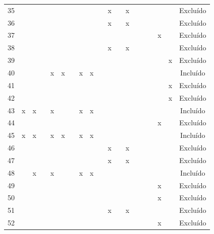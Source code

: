 \documentclass[
	12pt,				%
	oneside,			%
	a4paper,			%
	english,			%
	brazil				%
	]{abntex2ppgsi}
\begin{document}
\begin{apendicesenv}
\begin{table}[H]
\begin{tabular}{c | c c c c c c c c | c c c c c c c c c | c}
35 &   &   &   &   &   &   &   &   &   & x &   & x &   &   &   &   &   & Excluído \\
36 &   &   &   &   &   &   &   &   &   & x &   & x &   &   &   &   &   & Excluído \\
37 &   &   &   &   &   &   &   &   &   &   &   &   &   &   &   & x &   & Excluído \\
38 &   &   &   &   &   &   &   &   &   & x &   & x &   &   &   &   &   & Excluído \\
39 &   &   &   &   &   &   &   &   &   &   &   &   &   &   &   &   & x & Excluído \\
40 &   &   &   & x & x &   & x & x &   &   &   &   &   &   &   &   &   & Incluído \\
41 &   &   &   &   &   &   &   &   &   &   &   &   &   &   &   &   & x & Excluído \\
42 &   &   &   &   &   &   &   &   &   &   &   &   &   &   &   &   & x & Excluído \\
43 & x & x &   & x &   &   & x & x &   &   &   &   &   &   &   &   &   & Incluído \\
44 &   &   &   &   &   &   &   &   &   &   &   &   &   &   &   & x &   & Excluído \\
45 & x & x &   & x & x &   & x & x &   &   &   &   &   &   &   &   &   & Incluído \\
46 &   &   &   &   &   &   &   &   &   & x &   & x &   &   &   &   &   & Excluído \\
47 &   &   &   &   &   &   &   &   &   & x &   & x &   &   &   &   &   & Excluído \\
48 &   & x &   & x &   &   & x & x &   &   &   &   &   &   &   &   &   & Incluído \\
49 &   &   &   &   &   &   &   &   &   &   &   &   &   &   &   & x &   & Excluído \\
50 &   &   &   &   &   &   &   &   &   &   &   &   &   &   &   & x &   & Excluído \\
51 &   &   &   &   &   &   &   &   &   & x &   & x &   &   &   &   &   & Excluído \\
52 &   &   &   &   &   &   &   &   &   &   &   &   &   &   &   & x &   & Excluído \\
\bottomrule
\end{tabular}
\end{table}


\end{apendicesenv}
\end{document}
